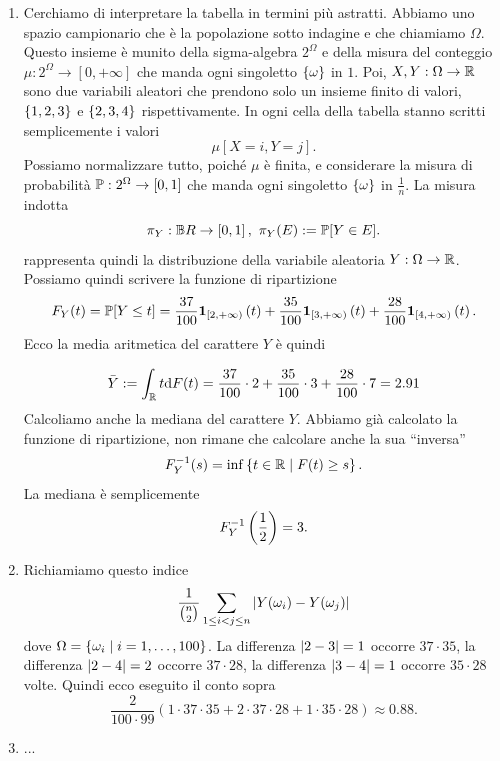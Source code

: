 \begin{soluzione}
\begin{enumerate}
\item Cerchiamo di interpretare la tabella in termini più astratti. Abbiamo uno spazio campionario che è la popolazione sotto indagine e che chiamiamo $\Omega$. Questo insieme è munito della sigma-algebra $2^\Omega$ e della misura del conteggio $\mu : 2^\Omega \to [0, +\infty]$ che manda ogni singoletto $\left\{\omega\right\}$ in $1$. Poi, $X, Y : \Omega \to \mathbb R$ sono due variabili aleatori che prendono solo un insieme finito di valori, $\left\{1, 2, 3\right\}$ e $\left\{2, 3, 4\right\}$ rispettivamente. In ogni cella della tabella stanno scritti semplicemente i valori
\[
	\mu\left[ X = i, Y = j\right] .
\]
Possiamo normalizzare tutto, poiché $\mu$ è finita, e considerare la misura di probabilità $\mathbb P : 2^\Omega \to [0, 1]$ che manda ogni singoletto $\left\{\omega\right\}$ in $\frac 1 n$. La misura indotta
\[
	\pi_Y : \mathbb B R \to [0, 1] \,,\ \pi_Y (E) := \mathbb P [ Y \in E ] .
\]
rappresenta quindi la distribuzione della variabile aleatoria $Y : \Omega \to \mathbb R$. Possiamo quindi scrivere la funzione di ripartizione
\[
	F_Y(t) = \mathbb P [Y \le t] =  \frac{37}{100}\mathbf 1_{[2, +\infty)}\left(t\right) + \frac{35}{100}\mathbf 1_{[3, +\infty)}\left(t\right) + \frac{28}{100}\mathbf 1_{[4, +\infty)}\left(t\right) .
\]
Ecco la media aritmetica del carattere $Y$ è quindi

\[
	\bar Y := \int_{\mathbb R} t \mathrm d F(t) = \frac{37}{100} \cdot 2 + \frac{35}{100} \cdot 3 + \frac{28}{100} \cdot 7 = 2.91
\]
Calcoliamo anche la mediana del carattere $Y$. Abbiamo già calcolato la funzione di ripartizione, non rimane che calcolare anche la sua \enquote{inversa}
\[
	F_Y^{-1}(s) = \inf \left\{t \in \mathbb R \mid F(t) \ge s\right\}.
\]
La mediana è semplicemente
\[
	F_Y^{-1} \left(\frac 12\right) = 3 .
\]

\item Richiamiamo questo indice
\[
	\frac{1}{{n \choose 2}} \sum_{1 \le i < j \le n} \left\lvert Y(\omega_i) - Y(\omega_j)\right\rvert
\]
dove $\Omega = \left\{\omega_i \mid i = 1, \dots, 100\right\}$. La differenza $\left\lvert2-3\right\rvert = 1$ occorre $37 \cdot 35$, la differenza $\left\lvert2-4\right\rvert = 2$ occorre $37 \cdot 28$, la differenza $\left\lvert3-4\right\rvert = 1$ occorre $35 \cdot 28$ volte. Quindi ecco eseguito il conto sopra
\[
	\frac{2}{100 \cdot 99} (1 \cdot 37 \cdot 35 + 2 \cdot 37 \cdot 28 + 1 \cdot 35 \cdot 28) \approx 0.88 .  
\]

\item ...
\end{enumerate}
\end{soluzione}

